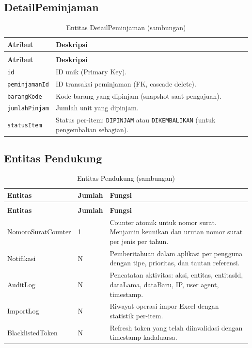 \documentclass[
  12pt,
  a4paper,
  oneside,
  final
]{report}
\begin{document}
\subsection{DetailPeminjaman}

\begin{longtable}[!htbp]{p{3.5cm} p{9cm}}
  \caption{Entitas DetailPeminjaman}
  \label{tab:entitas-detail-peminjaman} \\
  \toprule
  \textbf{Atribut} & \textbf{Deskripsi} \\
  \midrule
  \endfirsthead
  \caption[]{Entitas DetailPeminjaman (sambungan)} \\
  \toprule
  \textbf{Atribut} & \textbf{Deskripsi} \\
  \midrule
  \endhead
  \bottomrule
  \endfoot

  \texttt{id}            & ID unik (Primary Key). \\
  \texttt{peminjamanId}  & ID transaksi peminjaman (FK, cascade delete). \\
  \texttt{barangKode}   & Kode barang yang dipinjam (snapshot saat pengajuan). \\
  \texttt{jumlahPinjam} & Jumlah unit yang dipinjam. \\
  \texttt{statusItem}   & Status per-item: \texttt{DIPINJAM} atau
                          \texttt{DIKEMBALIKAN} (untuk pengembalian sebagian). \\
\end{longtable}

\subsection{Entitas Pendukung}

\begin{longtable}[!htbp]{p{3.5cm} p{3.5cm} p{5.5cm}}
  \caption{Entitas Pendukung}
  \label{tab:entitas-pendukung} \\
  \toprule
  \textbf{Entitas} & \textbf{Jumlah} & \textbf{Fungsi} \\
  \midrule
  \endfirsthead
  \caption[]{Entitas Pendukung (sambungan)} \\
  \toprule
  \textbf{Entitas} & \textbf{Jumlah} & \textbf{Fungsi} \\
  \midrule
  \endhead
  \bottomrule
  \endfoot

  NomoroSuratCounter & 1 & Counter atomik untuk nomor surat.
  Menjamin keunikan dan urutan nomor surat per jenis per tahun. \\[6pt]
  Notifikasi         & N & Pemberitahuan dalam aplikasi
  per pengguna dengan tipe, prioritas, dan tautan referensi. \\[6pt]
  AuditLog           & N & Pencatatan aktivitas: aksi, entitas,
  entitasId, dataLama, dataBaru, IP, user agent, timestamp. \\[6pt]
  ImportLog          & N & Riwayat operasi impor Excel
  dengan statistik per-item. \\[6pt]
  BlacklistedToken   & N & Refresh token yang telah
  diinvalidasi dengan timestamp kadaluarsa. \\
\end{longtable}
\end{document}
